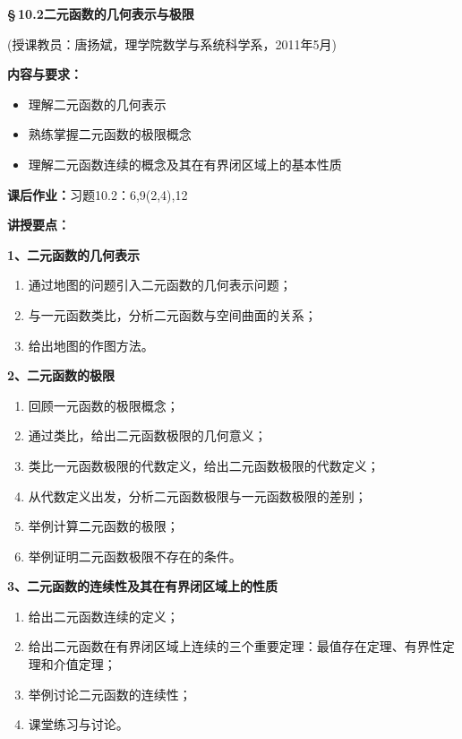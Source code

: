\documentclass[a4paper]{article}
\begin{document}
\newpage

\begin{center}
	{\Huge\bf \S\,10.2\;二元函数的几何表示与极限}
	
	(授课教员：唐扬斌，理学院数学与系统科学系，2011年5月)
\end{center}
\vspace{2em}
{\Large\bf 内容与要求：}
\begin{itemize}
  \item 理解二元函数的几何表示
  \item 熟练掌握二元函数的极限概念
  \item 理解二元函数连续的概念及其在有界闭区域上的基本性质
\end{itemize}

{\Large\bf 课后作业：}习题10.2：6,9(2,4),12

\bigskip

{\Large\bf 讲授要点：}

{\bf 1、二元函数的几何表示}

\begin{enumerate}[(1)]
  \item 通过地图的问题引入二元函数的几何表示问题；
  \item 与一元函数类比，分析二元函数与空间曲面的关系；
  \item 给出地图的作图方法。   
\end{enumerate}

{\bf 2、二元函数的极限}

\begin{enumerate}[(1)]
  \item 回顾一元函数的极限概念；
  \item 通过类比，给出二元函数极限的几何意义；
  \item 类比一元函数极限的代数定义，给出二元函数极限的代数定义；
  \item 从代数定义出发，分析二元函数极限与一元函数极限的差别；
  \item 举例计算二元函数的极限；
  \item 举例证明二元函数极限不存在的条件。 
\end{enumerate}

{\bf 3、二元函数的连续性及其在有界闭区域上的性质}

\begin{enumerate}[(1)]
  \item 给出二元函数连续的定义；
  \item 给出二元函数在有界闭区域上连续的三个重要定理：最值存在定理、有界性定理和介值定理；
  \item 举例讨论二元函数的连续性；
  \item 课堂练习与讨论。
\end{enumerate}
\end{document}
